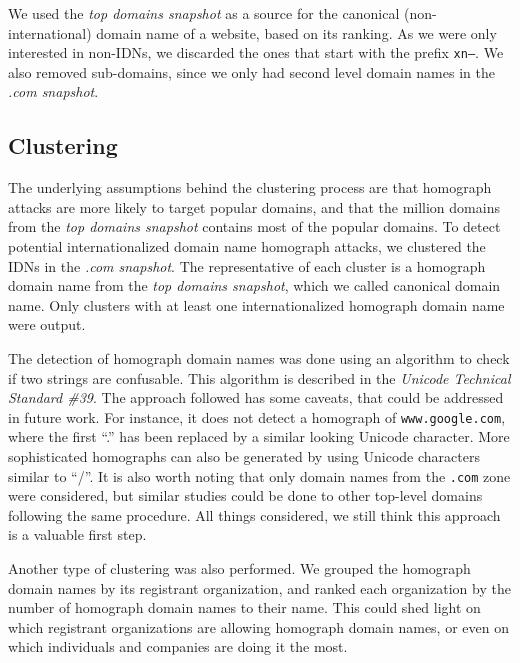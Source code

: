 \documentclass[letterpaper,twocolumn,10pt]{article}
\begin{document}
We used the \textit{top domains snapshot} as a source for the canonical (non-international) domain name of a website, based on its ranking.
As we were only interested in non-IDNs, we discarded the ones that start with the prefix \texttt{xn--}.
We also removed sub-domains, since we only had second level domain names in the \textit{.com snapshot}.

\subsection{Clustering}
The underlying assumptions behind the clustering process are that homograph attacks are more likely to target popular domains, and that the million domains from the \textit{top domains snapshot} contains most of the popular domains.
To detect potential internationalized domain name homograph attacks, we clustered the IDNs in the \textit{.com snapshot}.
The representative of each cluster is a homograph domain name from the \textit{top domains snapshot}, which we called canonical domain name.
Only clusters with at least one internationalized homograph domain name were output.

The detection of homograph domain names was done using an algorithm to check if two strings are confusable.
This algorithm is described in the \textit{Unicode Technical Standard \#39}.
The approach followed has some caveats, that could be addressed in future work.
For instance, it does not detect a homograph of \texttt{www.google.com}, where the first ``.'' has been replaced by a similar looking Unicode character.
More sophisticated homographs can also be generated by using Unicode characters similar to ``/''.
It is also worth noting that only domain names from the \texttt{.com} zone were considered, but similar studies could be done to other top-level domains following the same procedure.
All things considered, we still think this approach is a valuable first step.

Another type of clustering was also performed.
We grouped the homograph domain names by its registrant organization, and ranked each organization by the number of homograph domain names to their name.
This could shed light on which registrant organizations are allowing homograph domain names, or even on which individuals and companies are doing it the most.
\end{document}
